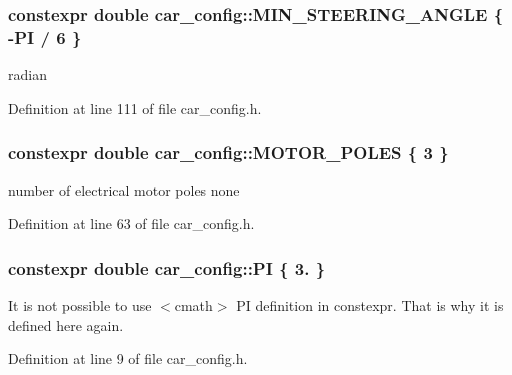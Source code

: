 \subsubsection[{\texorpdfstring{M\+I\+N\+\_\+\+S\+T\+E\+E\+R\+I\+N\+G\+\_\+\+A\+N\+G\+LE}{MIN_STEERING_ANGLE}}]{\setlength{\rightskip}{0pt plus 5cm}constexpr double car\+\_\+config\+::\+M\+I\+N\+\_\+\+S\+T\+E\+E\+R\+I\+N\+G\+\_\+\+A\+N\+G\+LE \{ -\/{\bf PI} / 6 \}}\hypertarget{namespacecar__config_a38229ce5d2e17e0c30b86864fb20d9ce}{}\label{namespacecar__config_a38229ce5d2e17e0c30b86864fb20d9ce}


radian 



Definition at line 111 of file car\+\_\+config.\+h.

\subsubsection[{\texorpdfstring{M\+O\+T\+O\+R\+\_\+\+P\+O\+L\+ES}{MOTOR_POLES}}]{\setlength{\rightskip}{0pt plus 5cm}constexpr double car\+\_\+config\+::\+M\+O\+T\+O\+R\+\_\+\+P\+O\+L\+ES \{ 3 \}}\hypertarget{namespacecar__config_a611a0f02cf52db1d438a2dd53b642cd5}{}\label{namespacecar__config_a611a0f02cf52db1d438a2dd53b642cd5}


number of electrical motor poles  none 



Definition at line 63 of file car\+\_\+config.\+h.

\subsubsection[{\texorpdfstring{PI}{PI}}]{\setlength{\rightskip}{0pt plus 5cm}constexpr double car\+\_\+config\+::\+PI \{ 3. \}}\hypertarget{namespacecar__config_a90cb9957197db8924811c447bc98703a}{}\label{namespacecar__config_a90cb9957197db8924811c447bc98703a}


It is not possible to use $<$cmath$>$ PI definition in constexpr. That is why it is defined here again. 



Definition at line 9 of file car\+\_\+config.\+h.

